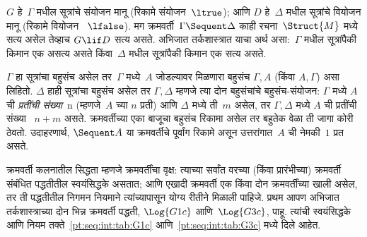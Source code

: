 $G$ हे~$\Gamma$ मधील सूत्रांचे संयोजन
मानू (रिकामे संयोजन~$\ltrue$); आणि $D$ हे~$\Delta$
मधील सूत्रांचे वियोजन मानू (रिकामे वियोजन
~$\lfalse$). मग क्रमवर्ती~$\Gamma \Sequent \Delta$
काही रचना~$\Struct{M}$ मध्ये सत्य असेल
तेव्हाच $G \lif D$ सत्य असते. अभिजात
तर्कशास्त्रात याचा अर्थ असा:~$\Gamma$ मधील
सूत्रांपैकी किमान एक असत्य असते किंवा~$\Delta$
मधील सूत्रांपैकी किमान एक सत्य असते.

$\Gamma$ हा सूत्रांचा बहुसंच असेल
तर~$\Gamma$ मध्ये~$A$ जोडल्यावर मिळणारा बहुसंच $\Gamma, A$
(किंवा $A, \Gamma$) असा लिहितो. $\Delta$ हाही
सूत्रांचा बहुसंच असेल तर $\Gamma, \Delta$
म्हणजे त्या दोन बहुसंचांचे बहुसंच-संयोजन: $\Gamma$
मध्ये $A$ ची \emph{प्रतींची संख्या}~n (म्हणजे~$A$
च्या $n$ प्रती) आणि $\Delta$ मध्ये ती~$m$ असेल,
तर $\Gamma, \Delta$ मध्ये $A$ ची प्रतींची संख्या
~$n+m$ असते. क्रमवर्तीच्या एका बाजूचा बहुसंच रिकामा
असेल तर बहुतेक वेळा ती जागा कोरी ठेवतो. उदाहरणार्थ,
$\Sequent A$ या क्रमवर्तीचे पूर्वांग रिकामे असून
उत्तरांगात~$A$ ची नेमकी~$1$ प्रत असते.

क्रमवर्ती कलनातील सिद्धता म्हणजे
क्रमवर्तींचा वृक्ष: त्याच्या सर्वांत वरच्या (किंवा
प्रारंभीच्या) क्रमवर्ती संबंधित पद्धतीतील स्वयंसिद्धके
असतात; आणि एखादी क्रमवर्ती एक किंवा दोन क्रमवर्तींच्या
खाली असेल, तर ती पद्धतीतील निगमन नियमाने त्यांच्यापासून
योग्य रीतीने मिळाली पाहिजे. प्रथम आपण अभिजात
तर्कशास्त्राच्या दोन भिन्न क्रमवर्ती पद्धती, $\Log{G1c}$
आणि~$\Log{G3c}$, पाहू. त्यांची स्वयंसिद्धके आणि नियम
तक्ते~\ref{pt:seq:int:tab:G1c} आणि~\ref{pt:seq:int:tab:G3c}
मध्ये दिले आहेत.








